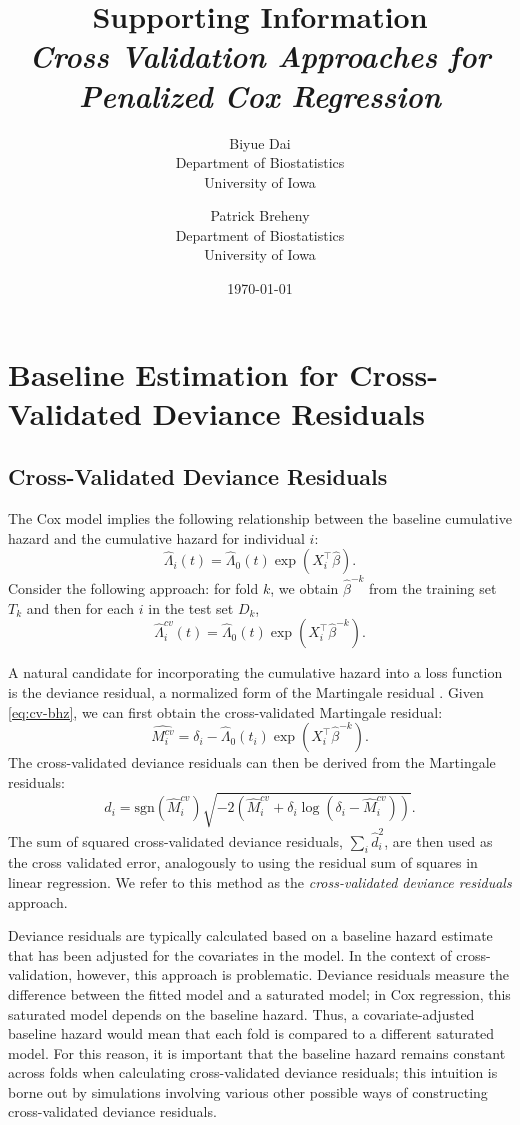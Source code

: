 \documentclass{article}
\title{Supporting Information\\
\textit{Cross Validation Approaches for Penalized Cox Regression}}
\author{Biyue Dai\\Department of Biostatistics\\University of Iowa
  \and
  Patrick Breheny\\Department of Biostatistics\\University of Iowa}
\date{\today}
\providecommand{\Tr}{^{\scriptscriptstyle\top}}
\begin{document}
\maketitle

\section{Baseline Estimation for Cross-Validated Deviance Residuals}
\subsection{Cross-Validated Deviance Residuals}
The Cox model implies the following relationship between the baseline cumulative hazard and the cumulative hazard for individual $i$:
\begin{equation}
  \hat{\Lambda}_{i}(t) =  \hat{\Lambda}_{0}(t)\exp(X_i\Tr\hat\beta).
\end{equation}
Consider the following approach: for fold $k$, we obtain $\hat{\beta}^{-k}$ from the training set $T_k$ and then for each $i$ in the test set $D_k$, 
\begin{equation}
 \label{eq:cv-bhz}
  \hat{\Lambda}^{cv}_{i}(t) =  \hat{\Lambda}_{0}(t)\exp(X_i\Tr\hat\beta^{-k}).
\end{equation}

A natural candidate for incorporating the cumulative hazard into a loss function is the deviance residual, a normalized form of the Martingale residual \citep{Therneau1990}.  Given \eqref{eq:cv-bhz}, we can first obtain the cross-validated Martingale residual: 
\begin{equation}
  \hat{M^{cv}_{i}} = \delta_{i} - \hat{\Lambda}_{0}(t_{i})\exp(X_i\Tr\hat\beta^{-k}).
\end{equation}
The cross-validated deviance residuals can then be derived from the Martingale residuals: 
\begin{equation} 
  d_{i} = \text{sgn}(\hat{M}^{cv}_{i})\sqrt{-2(\hat{M}^{cv}_{i} + \delta_{i}\log(\delta_{i} - \hat{M}^{cv}_{i}))}.
\end{equation}
The sum of squared cross-validated deviance residuals, $\sum_{i}\hat{d}_{i}^2$, are then used as the cross validated error, analogously to using the residual sum of squares in linear regression. We refer to this method as the \emph{cross-validated deviance residuals} approach.

Deviance residuals are typically calculated based on a baseline hazard estimate that has been adjusted for the covariates in the model. In the context of cross-validation, however, this approach is problematic. Deviance residuals measure the difference between the fitted model and a saturated model; in Cox regression, this saturated model depends on the baseline hazard. Thus, a covariate-adjusted baseline hazard would mean that each fold is compared to a different saturated model. For this reason, it is important that the baseline hazard remains constant across folds when calculating cross-validated deviance residuals; this intuition is borne out by simulations involving various other possible ways of constructing cross-validated deviance residuals.  
\end{document}
